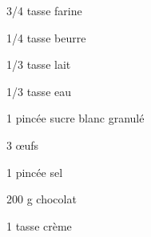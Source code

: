 %
%   
%   
%   
%




\totaltime{}


\begin{ingredients}
    \item[] 
    \item 3/4 tasse farine
    \item 1/4 tasse beurre
    \item 1/3 tasse lait
    \item 1/3 tasse eau
    \item 1 pincée sucre blanc granulé
    \item 3 œufs
    \item 1 pincée sel
    \\
    \item[] 
    \item 200 g chocolat
    \item 1 tasse crème
\end{ingredients}

